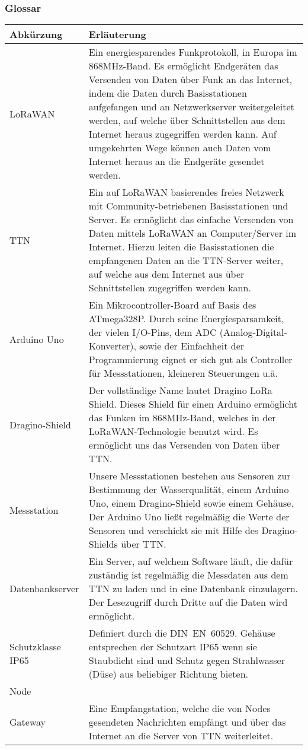 \documentclass[
11pt,
a4paper,
ngerman,
]{article}
\begin{document}
\subsubsection{Glossar}
\begin{table}[H]
	\begin{tabularx}{\textwidth}{ |m{3.0cm}|X| }
		\hline
		\rowcolor[gray]{.8}
		\rule{0pt}{18pt}
		\textbf{ Abkürzung } & \textbf{ Erläuterung } \\
		\hline
		LoRaWAN & Ein energiesparendes Funkprotokoll, in Europa im 868MHz-Band. Es ermöglicht Endgeräten das Versenden von Daten über Funk an das Internet, indem die Daten durch Basisstationen aufgefangen und an Netzwerkserver weitergeleitet werden, auf welche über Schnittstellen aus dem Internet heraus zugegriffen werden kann. Auf umgekehrten Wege können auch Daten vom Internet heraus an die Endgeräte gesendet werden. \\
		\hline
		TTN & Ein auf LoRaWAN basierendes freies Netzwerk mit Community-betriebenen Basisstationen und Server. Es ermöglicht das einfache Versenden von Daten mittels LoRaWAN an Computer/Server im Internet. Hierzu leiten die Basisstationen die empfangenen Daten an die TTN-Server weiter, auf welche aus dem Internet aus über Schnittstellen zugegriffen werden kann. \\
		\hline
		Arduino Uno & Ein Mikrocontroller-Board auf Basis des ATmega328P. Durch seine Energiesparsamkeit, der vielen I/O-Pins, dem ADC (Analog-Digital-Konverter), sowie der Einfachheit der Programmierung eignet er sich gut als Controller für Messstationen, kleineren Steuerungen u.ä. \\
		\hline
		Dragino-Shield & Der vollständige Name lautet Dragino LoRa Shield. Dieses Shield für einen Arduino ermöglicht das Funken im 868MHz-Band, welches in der LoRaWAN-Technologie benutzt wird. Es ermöglicht uns das Versenden von Daten über TTN. \\
		\hline
		Messstation & Unsere Messstationen bestehen aus Sensoren zur Bestimmung der Wasserqualität, einem Arduino Uno, einem Dragino-Shield sowie einem Gehäuse. Der Arduino Uno ließt regelmäßig die Werte der Sensoren und verschickt sie mit Hilfe des Dragino-Shields über TTN. \\
		\hline
		Datenbankserver & Ein Server, auf welchem Software läuft, die dafür zuständig ist regelmäßig die Messdaten aus dem TTN zu laden und in eine Datenbank einzulagern. Der Lesezugriff durch Dritte auf die Daten wird ermöglicht. \\
		\hline
		Schutzklasse IP65 & Definiert durch die DIN~EN~60529. Gehäuse entsprechen der Schutzart IP65 wenn sie Staubdicht sind und Schutz gegen Strahlwasser (Düse) aus beliebiger Richtung bieten. \\
		\hline
		Node &  \\
		\hline
		Gateway & Eine Empfangstation, welche die von Nodes gesendeten Nachrichten empfängt und über das Internet an die Server von TTN weiterleitet. \\
		\hline  
	\end{tabularx}
\end{table}
\end{document}
